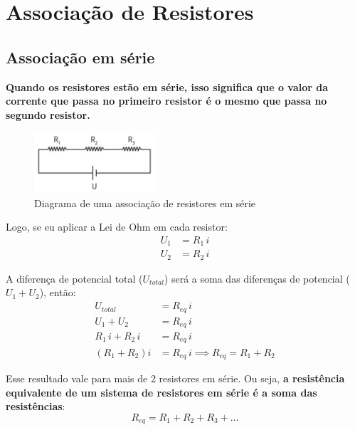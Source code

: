 \documentclass[12pt]{extarticle}
\newcommand{\<}{\langle}
\renewcommand{\>}{\rangle}
\theoremstyle{definition}
\begin{document}
\section{Associação de Resistores}
\subsection{Associação em série}

\textbf{Quando os resistores estão em série, isso significa que o valor da corrente que passa no primeiro resistor é o mesmo que passa no segundo resistor.} 
\begin{figure}[H]
    \centering
    \includegraphics[width=0.4\textwidth]{resistores_em_serie.jpg}
    \caption{Diagrama de uma associação de resistores em série}
    \label{fig:serie}
\end{figure}

Logo, se eu aplicar a Lei de Ohm em cada resistor:
\begin{equation}
    \begin{split}
        U_1 &= R_1\,i\\
        U_2 &= R_2\,i
    \end{split}
\end{equation}

A diferença de potencial total ($U_{total}$) será a soma das diferenças de potencial ($U_1 + U_2$), então:
\begin{equation}
    \begin{split}
        U_{total} &= R_{eq}\,i\\
        U_1 + U_2 &= R_{eq}\,i\\
        R_1\,i + R_2\,i &= R_{eq}\,i\\
        (R_1+R_2)i &= R_{eq}\,i \implies \boxed{R_{eq} = R_1+R_2}
    \end{split}
\end{equation}

Esse resultado vale para mais de 2 resistores em série. Ou seja, \textbf{a resistência equivalente de um sistema de resistores em série é a soma das resistências}:
\begin{equation}
    R_{eq} = R_1+R_2+R_3 + \dots
\end{equation}
\end{document}
